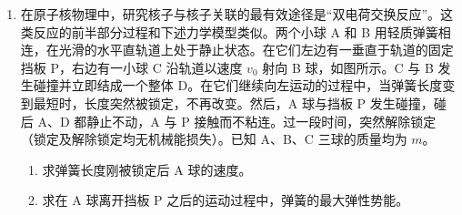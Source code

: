 \documentclass[\gkver]{gaokaozhenti}
\begin{document}
\begin{enumerate}
{由前面分析可知，要回到 S 点，粒子从 a 到 b 必经过 $\frac{3}{4}$ 圆周，所以半径 $R$ 必定等于筒的外半径 $r_{0}$，即

$R = r_{0}$ ③

由以上各式解得

$U = \frac{qr_{0}^{2}B^{2}}{2m}$ ④


评分标准：本题 13 分。①式 2 分，②式 2 分，经分析得出③式 6 分，解得④式 3 分。
}

\item
在原子核物理中，研究核子与核子关联的最有效途径是“双电荷交换反应”。这类反应的前半部分过程和下述力学模型类似。两个小球 A 和 B 用轻质弹簧相连，在光滑的水平直轨道上处于静止状态。在它们左边有一垂直于轨道的固定挡板 P，右边有一小球 C 沿轨道以速度 $v_{0}$ 射向 B 球，如图所示。C 与 B 发生碰撞并立即结成一个整体 D。在它们继续向左运动的过程中，当弹簧长度变到最短时，长度突然被锁定，不再改变。然后，A 球与挡板 P 发生碰撞，碰后 A、D 都静止不动，A 与 P 接触而不粘连。过一段时间，突然解除锁定（锁定及解除锁定均无机械能损失）。已知 A、B、C 三球的质量均为 $m$。
\begin{enumerate}
\item
求弹簧长度刚被锁定后 A 球的速度。

\item
求在 A 球离开挡板 P 之后的运动过程中，弹簧的最大弹性势能。
\end{enumerate}


\end{enumerate}
\end{document}
